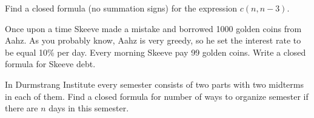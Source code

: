 \documentclass[addpoints,answers]{exam}
\begin{document}
    \pagestyle{headandfoot}
    \runningheadrule

    \firstpagefooter{}{}{}
    \runningfooter{}{}{}
    \begin{flushright}

        \vspace{0.2in}

    \end{flushright}

    \begin{questions}
        \question[10]
            Find a closed formula (no summation signs) for the expression 
            $c(n, n - 3)$.
            \begin{solutionorbox}[\stretch{1}]
            \end{solutionorbox}
            \newpage
 
        \question[10]
            Once upon a time Skeeve made a mistake and borrowed 1000 golden coins from Aahz.
            As you probably know, Aahz is very greedy, so he set the interest rate to be
            equal 10\% per day. Every morning Skeeve pay 99 golden coins. Write a closed
            formula for Skeeve debt.
            \begin{solutionorbox}[\stretch{1}]
            \end{solutionorbox}
            \newpage
 
        \question[10]
            In Durmstrang Institute every semester consists of two parts with two midterms
            in each of them. Find a closed formula for number of ways to organize semester
            if there are $n$ days in this semester.
            \begin{solutionorbox}[\stretch{1}]
            \end{solutionorbox}
            \newpage
 
\end{questions}
\end{document}
